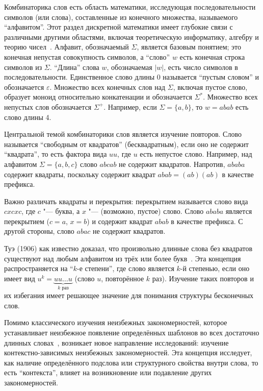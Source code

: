 \documentclass[a4paper,14pt]{extreport}
\theoremstyle{plain}
\theoremstyle{definition}
\theoremstyle{remark}
\begin{document}
Комбинаторика слов есть область математики, исследующая последовательности символов (или слова), составленные из конечного множества, называемого ``алфавитом''. Этот раздел дискретной математики имеет глубокие связи с различными другими областями, включая теоретическую информатику, алгебру и теорию чисел~\cite{Berstel}. Алфавит, обозначаемый $\Sigma$, является базовым понятием; это конечная непустая совокупность символов, а ``слово'' $w$ есть конечная строка символов из $\Sigma$. ``Длина'' слова $w$, обозначаемая $|w|$, есть число символов в последовательности. Единственное слово длины 0 называется ``пустым словом'' и обозначается $\varepsilon$. Множество всех конечных слов над $\Sigma$, включая пустое слово, образует моноид относительно конкатенации и обозначается $\Sigma^*$. Множество всех непустых слов обозначается $\Sigma^+$. Например, если $\Sigma = \{a, b\}$, то $w = abab$ есть слово длины 4.

Центральной темой комбинаторики слов является изучение повторов. Слово называется ``свободным от квадратов'' (бесквадратным), если оно не содержит ``квадрата'', то есть фактора вида $uu$, где $u$ есть непустое слово. Например, над алфавитом $\Sigma = \{a, b, c\}$ слово $abcab$ не содержит квадратов. Напротив, $ababa$ содержит квадраты, поскольку содержит квадрат $abab = (ab)(ab)$ в качестве префикса. 

Важно различать квадраты и перекрытия: перекрытием называется слово вида $cxcxc$, где $c$ "--- буква, а $x$ "--- (возможно, пустое) слово. Слово $ababa$ является перекрытием ($c=a$, $x=b$) и содержит квадрат $abab$ в качестве префикса. С другой стороны, слово $abac$ не содержит квадратов.

Туэ (1906) как известно доказал, что произвольно длинные слова без квадратов существуют над любым алфавитом из трёх или более букв~\cite{Thue}. Эта концепция распространяется на ``$k$-е степени'', где слово является $k$-й степенью, если оно имеет вид $u^k = \underbrace{uu\dots u}_{k \text{ раз}}$ (слово $u$, повторённое $k$ раз). Изучение таких повторов и их избегания имеет решающее значение для понимания структуры бесконечных слов.

Помимо классического изучения неизбежных закономерностей, которое устанавливает неизбежное появление определённых шаблонов во всех достаточно длинных словах~\cite{Berstel}, возникает новое направление исследований: изучение контекстно-зависимых неизбежных закономерностей. Эта концепция исследует, как наличие определённого подслова или структурного свойства внутри слова, то есть ``контекста'', влияет на возникновение или подавление других закономерностей.
\end{document}
